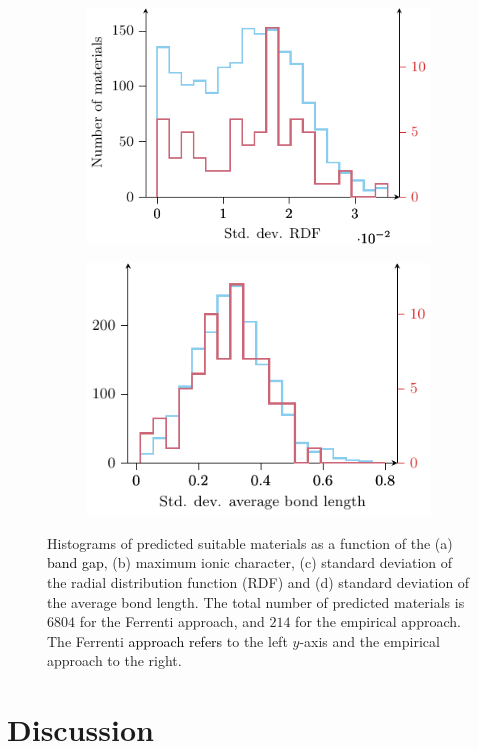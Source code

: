 \documentclass[superscriptaddress,unsortedaddress,
 amsmath,amssymb,
 aps,
]{revtex4-2}
\newcommand{\mrk}[1]{\textcolor{black}{#1}}
\begin{document}
\begin{figure}[t]
\begin{subfigure}[b]{0.45\textwidth}
    \includegraphics{figure7c.pdf}
    \subcaption{}
\end{subfigure}
\begin{subfigure}[b]{0.45\textwidth}
    \includegraphics{figure7d.pdf}
    \subcaption{}
\end{subfigure}
\caption{Histograms of predicted suitable materials as a function of the (a) \mrk{band gap}, (b) maximum ionic character, (c) standard deviation of the radial distribution function (RDF) and (d) standard deviation of the average bond length. The total number of predicted materials is  $6804$ for the Ferrenti approach, and $214$ for the empirical approach. The Ferrenti \mrk{approach refers} to the left $y$-axis and the empirical approach to the right.
}
\label{fig:histogram_new}
\end{figure}

\section*{Discussion} 
\end{document}
